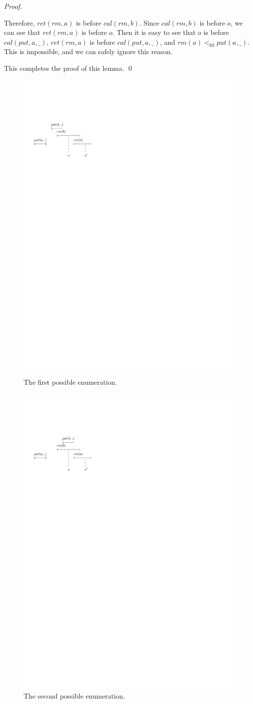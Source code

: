 \documentclass{llncs}
\begin{document}
\begin {proof}
\begin{itemize}
    Therefore, $\textit{ret}(\textit{rm},a)$ is before $\textit{cal}(\textit{rm},b)$. Since $\textit{cal}(\textit{rm},b)$ is before $o$, we can see that $\textit{ret}(\textit{rm},a)$ is before $o$. Then it is easy to see that $o$ is before $\textit{cal}(\textit{put},a,\_)$, $\textit{ret}(\textit{rm},a)$ is before $\textit{cal}(\textit{put},a,\_)$, and $\textit{rm}(a) <_{\textit{hb}} \textit{put}(a,\_)$. This is impossible, and we can safely ignore this reason.
\end{itemize}

This completes the proof of this lemma. \qed
\end {proof}

\begin{figure}[htbp]
  \centering
  \includegraphics[width=0.4 \textwidth]{PIC-HIS-Apr2-A-1.pdf}
  \caption{The first possible enumeration.}
  \label{fig:history enumeration 1 for Rpr2}
\end{figure}


\begin{figure}[htbp]
  \centering
  \includegraphics[width=0.4 \textwidth]{PIC-HIS-Apr2-A-2.pdf}
  \caption{The second possible enumeration.}
  \label{fig:history enumeration 2 for Rpr2}
\end{figure}
\end{document}
